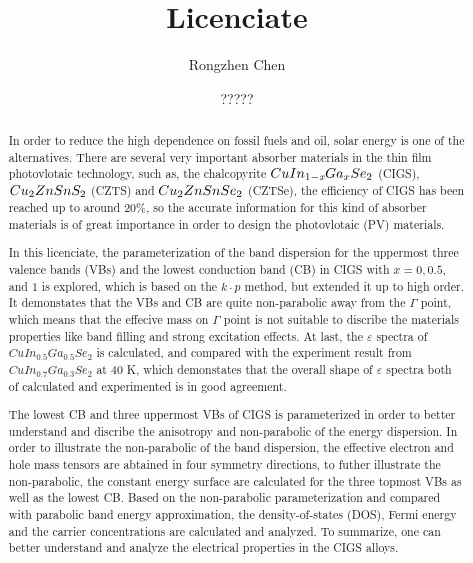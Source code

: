\documentclass[a4paper]{report}
\begin{document}
\title{Licenciate}
\author{Rongzhen Chen}
\date{?????}

\maketitle

\tableofcontents




\begin{abstract}
\noindent In order to reduce the high dependence on fossil fuels and oil, solar energy is one of the alternatives.
There are several very important absorber materials in the thin film photovlotaic technology, such as, the chalcopyrite $CuIn_{1-\textit{x}}Ga_{x}Se_2$ (CIGS), $Cu_2ZnSnS_2$ (CZTS) and $Cu_2ZnSnSe_2$ (CZTSe),
the efficiency of CIGS has been reached up to around 20\%, so the accurate information for this kind of absorber materials is of great importance in order to
design the photovlotaic (PV) materials. 

\noindent In this licenciate, the parameterization of the band dispersion for the uppermost three valence bands (VBs) and the lowest conduction
band (CB) in CIGS with $x=0, 0.5$, and $1$ is explored, which is based on the $k \cdot p$ method, but extended it up to high order. It demonstates that the VBs and CB
are quite non-parabolic away from the $\Gamma$ point, which means that the effecive mass on $\Gamma$ point is not suitable to discribe the materials properties like 
band filling and strong excitation effects. At last, the $\varepsilon$ spectra of $CuIn_{0.5}Ga_{0.5}Se_2$ is calculated, and compared with the
experiment result from $CuIn_{0.7}Ga_{0.3}Se_2$ at 40 K, which demonstates that the overall shape of $\varepsilon$ spectra both of calculated and experimented 
is in good agreement.

\noindent The lowest CB and three uppermost VBs of CIGS is parameterized in order to better understand and discribe the anisotropy and non-parabolic of the energy dispersion.
In order to illustrate the non-parabolic of the band dispersion, the effective electron and hole mass tensors are abtained in four symmetry directions, to futher illustrate
the non-parabolic, the constant energy surface are calculated for the three topmost VBs as well as the lowest CB. Based on the non-parabolic parameterization and compared
with parabolic band energy approximation, the density-of-states (DOS), Fermi energy and the carrier concentrations are calculated and analyzed. To summarize, one can better
understand and analyze the electrical properties in the CIGS alloys.



\end{abstract}
\end{document}
